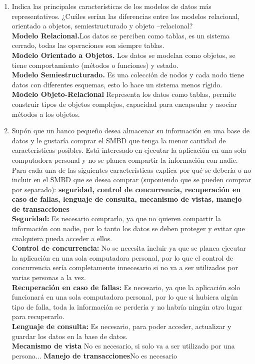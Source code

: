 \documentclass[12pt]{article}
\begin{document}
\begin{enumerate}
\begin{itemize}
	  \end{itemize}

      \item Indica las principales características de los modelos de
      datos más representativos. ¿Cuáles serían las diferencias
      entre los  modelos relacional, orientado a objetos,
      semiestructurado y objeto –relacional?\\
      \textbf{Modelo Relacional.}Los datos se perciben como tablas,
      es un sistema cerrado, todas las operaciones son siempre tablas.\\
      \textbf{Modelo Orientado a Objetos.} Los datos se modelan como
      objetos, se tiene comportamiento (métodos o funciones) y estado.\\
      \textbf{Modelo Semiestructurado.} Es una colección de nodos y
      cada nodo tiene datos con diferentes esquemas, esto lo hace un
      sistema menos rígido.\\
      \textbf{Modelo Objeto-Relacional} Representa los datos como tablas,
      permite construir tipos de objetos complejos, capacidad para
      encapsular y asociar métodos a los objetos.

      \item Supón  que  un banco pequeño desea  almacenar  su
      información  en una  base  de  datos  y  le gustaría comprar
      el SMBD que  tenga  la  menor  cantidad  de  características
      posibles. Está interesado en ejecutar la aplicación en una sola computadora personal y no se planea compartir la
      información  con  nadie.  Para  cada  una  de  las
      siguientes  características  explica  por  qué  se debería o
      no incluir en el SMBD que se desea comprar (suponiendo que se
      pueden comprar por separado): \textbf{seguridad, control de
      concurrencia, recuperación en caso de fallas, lenguaje de
      consulta, mecanismo de vistas, manejo de transacciones}\\
      \textbf{Seguridad:} Es necesario comprarlo, ya que no quieren
      compartir la información con nadie, por lo tanto los datos
      se deben proteger y evitar que cualquiera pueda acceder a
      ellos.\\
      \textbf{Control de concurrencia:} No se necesita incluir ya que
      se planea ejecutar la aplicación en una sola computadora
      personal, por lo que el control de concurrencia sería
      completamente innecesario si no va a ser utilizados por varias
      personas a la vez.\\
      \textbf{Recuperación en caso de fallas:} Es necesario, ya que
      la aplicación solo funcionará en una sola computadora personal,
      por lo que si hubiera algún tipo de falla, toda la información
      se perdería y no habría ningún otro lugar para recuperarlo.\\
      \textbf{Lenguaje de consulta:} Es necesario, para poder acceder,
      actualizar y guardar los datos en la base de datos.\\
      \textbf{Mecanismo de vista} No es necesario, si solo va a ser
      utilizado por una persona...
      \textbf{Manejo de transacciones}No es necesario\\


\end{enumerate}
\end{document}
